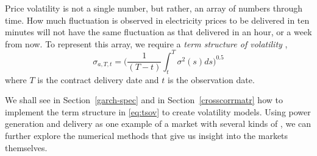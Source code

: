 Price volatility is not a single number, but rather, an array of numbers through time. How much fluctuation is observed in electricity prices to be delivered in ten minutes will not have the same fluctuation as that delivered in an hour, or a week from now. To represent this array, we require a \emph{term structure of volatility} \cite[p. 328]{harris2006em},
\begin{equation}
\sigma_{a,T,t} = \Bigg( \frac{1}{(T-t)} \int^T_t \sigma^2(s)ds \Bigg)^{0.5}
\label{eq:tsov}
\end{equation}
where $T$ is the contract delivery date and $t$ is the observation date.

We shall see in Section~\ref{garch-spec} and in Section~\ref{crosscorrmatr} how to implement the term structure in \eqref{eq:tsov} to create volatility models. Using power generation and delivery as one example of a market with several kinds of \fts{}, we can further explore the numerical methods that give us insight into the markets themselves.